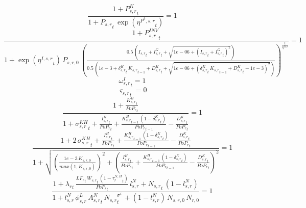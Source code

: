 \noindent[name= `Rental price of capital 1 1']
\begin{dmath}
\frac{1+{{P^K_{s,r}}}_{t}}{1+{{P_{s,r}}}_{t}\, \exp\left({{\eta^{P^k,s,r}}}_{t}\right)}=1
\end{dmath}
\noindent[name= `Investment goods purchase price 1 1']
\begin{dmath}
\frac{1+{{P^{INV}_{s,r}}}_{t}}{1+\exp\left({{\eta^{I,s,r}}}_{t}\right)\, {{P_{s,r,0}}}\, \left(\frac{0.5\, \left({{I_{s,r}}}_{t}+{{I^G_{s,r}}}_{t}+\sqrt{1e-06+\left({{I_{s,r}}}_{t}+{{I^G_{s,r}}}_{t}\right)^{2}}\right)}{0.5\, \left(1e-3+{{\delta^{K}_{s,r}}}_{t}\, {{K_{s,r}}}_{t-1}+{{D^K_{s,r}}}_{t}+\sqrt{1e-06+\left({{\delta^{K}_{s,r}}}_{t}\, {{K_{s,r}}}_{t-1}+{{D^K_{s,r}}}_{t}-1e-3\right)^{2}}\right)}\right)^{\frac{1}{{{\eta^{KS}}}}}}=1
\end{dmath}
\noindent[name= `HH FOC investment 1 1']
\begin{dmath}
{{\omega^I_{s,r}}}_{t}=1
\end{dmath}
\noindent[name= `HH capital scrapping 1 1']
\begin{dmath}
{{\varsigma_{s,r}}}_{t}=0
\end{dmath}
\noindent[name= `LOM capital 1 1']
\begin{dmath}
\frac{1+\frac{{{K^H_{s,r}}}_{t}}{{{PoP_r}}_{t}}}{1+{{\sigma^{KH}_{s,r}}}_{t}+\frac{{{I^H_{s,r}}}_{t}}{{{PoP_r}}_{t}}+\frac{{{K^H_{s,r}}}_{t-1}\, \left(1-{{\delta^{K}_{s,r}}}_{t}\right)}{{{PoP_r}}_{t-1}}-\frac{{{D^K_{s,r}}}_{t}}{{{PoP_r}}_{t}}}=1
\end{dmath}
\noindent[name= `Capital non-negativity slack 1 1']
\begin{dmath}
\frac{1+2\, {{\sigma^{KH}_{s,r}}}_{t}+\frac{{{I^H_{s,r}}}_{t}}{{{PoP_r}}_{t}}+\frac{{{K^H_{s,r}}}_{t-1}\, \left(1-{{\delta^{K}_{s,r}}}_{t}\right)}{{{PoP_r}}_{t-1}}-\frac{{{D^K_{s,r}}}_{t}}{{{PoP_r}}_{t}}}{1+\sqrt{\left(\frac{1e-3\, {{K_{s,r,0}}}}{max(1,{{K_{s,r,0}}})}\right)^{2}+\left(\frac{{{I^H_{s,r}}}_{t}}{{{PoP_r}}_{t}}+\frac{{{K^H_{s,r}}}_{t-1}\, \left(1-{{\delta^{K}_{s,r}}}_{t}\right)}{{{PoP_r}}_{t-1}}-\frac{{{D^K_{s,r}}}_{t}}{{{PoP_r}}_{t}}\right)^{2}}}=1
\end{dmath}
\noindent[name= `FOC labour supply 1 1']
\begin{dmath}
\frac{1+{\lambda_r}_{t}\, \frac{{{LF_r}}_{t}\, {{W_{s,r}}}_{t}\, \left(1-{{\tau^{N,H}_{r}}}_{t}\right)}{{{PoP_r}}_{t}}\, {{l^{N}_{s,r}}}+{{N_{s,r}}}_{t}\, \left(1-{{l^{N}_{s,r}}}\right)}{1+{{l^{N}_{s,r}}}\, {{\phi^{L}_{s,r}}}\, {{A^{N}_{s,r}}}_{t}\, {{N_{s,r}}}_{t}^{{{\sigma^{L}}}}+\left(1-{{l^{N}_{s,r}}}\right)\, {{N_{s,r,0}}}\, {{N_{r,0}}}}=1
\end{dmath}

